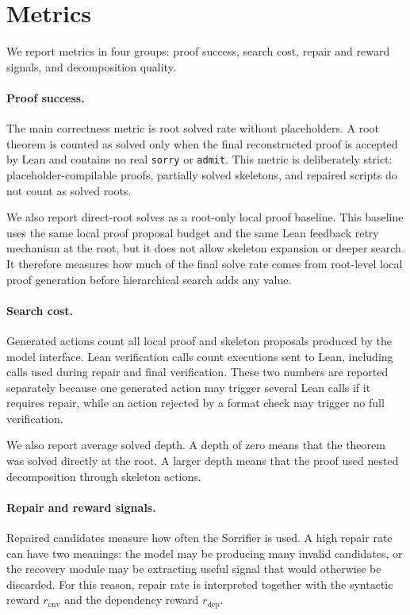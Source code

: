 \documentclass[en]{uet_awesome_thesis/uet-awesome-thesis}
\begin{document}
\section{Metrics}

We report metrics in four groups: proof success, search cost, repair and reward signals, and decomposition quality.

\paragraph{Proof success.}
The main correctness metric is root solved rate without placeholders. A root theorem is counted as solved only when the final reconstructed proof is accepted by Lean and contains no real \texttt{sorry} or \texttt{admit}. This metric is deliberately strict: placeholder-compilable proofs, partially solved skeletons, and repaired scripts do not count as solved roots.

We also report direct-root solves as a root-only local proof baseline. This baseline uses the same local
proof proposal budget and the same Lean feedback retry mechanism at the root, but it does not allow
skeleton expansion or deeper search. It therefore measures how much of the final solve rate comes from
root-level local proof generation before hierarchical search adds any value.

\paragraph{Search cost.}
Generated actions count all local proof and skeleton proposals produced by the model interface. Lean verification calls count executions sent to Lean, including calls used during repair and final verification. These two numbers are reported separately because one generated action may trigger several Lean calls if it requires repair, while an action rejected by a format check may trigger no full verification.

We also report average solved depth. A depth of zero means that the theorem was solved directly at the root. A larger depth means that the proof used nested decomposition through skeleton actions.

\paragraph{Repair and reward signals.}
Repaired candidates measure how often the Sorrifier is used. A high repair rate can have two meanings: the model may be producing many invalid candidates, or the recovery module may be extracting useful signal that would otherwise be discarded. For this reason, repair rate is interpreted together with the syntactic reward \(r_{\mathrm{env}}\) and the dependency reward \(r_{\mathrm{dep}}\).
\end{document}
